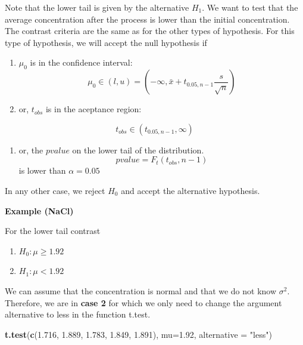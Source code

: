 \documentclass[
]{book}
\newenvironment{Shaded}{\begin{snugshade}}{\end{snugshade}}
\newcommand{\AttributeTok}[1]{\textcolor[rgb]{0.13,0.29,0.53}{#1}}
\newcommand{\FloatTok}[1]{\textcolor[rgb]{0.00,0.00,0.81}{#1}}
\newcommand{\FunctionTok}[1]{\textcolor[rgb]{0.13,0.29,0.53}{\textbf{#1}}}
\newcommand{\NormalTok}[1]{#1}
\newcommand{\StringTok}[1]{\textcolor[rgb]{0.31,0.60,0.02}{#1}}
\providecommand{\tightlist}{%
  \setlength{\itemsep}{0pt}\setlength{\parskip}{0pt}}
\begin{document}
Note that the lower tail is given by the alternative \(H_1\). We want to test that the average concentration after the process is lower than the initial concentration. The contrast criteria are the same as for the other types of hypothesis. For this type of hypothesis, we will accept the null hypothesis if

\begin{enumerate}
\def\labelenumi{\arabic{enumi}.}
\item
  \(\mu_0\) is in the confidence interval:
  \[\mu_0\in (l,u)=(-\infty, \bar{x}+t_{0.05,n-1} \frac{s}{\sqrt{n}})\]
\item
  or, \(t_{obs}\) is in the aceptance region:
\end{enumerate}

\[t_{obs}\in (t_{0.05,n-1}, \infty)\]

\begin{enumerate}
\def\labelenumi{\arabic{enumi}.}
\setcounter{enumi}{2}
\tightlist
\item
  or, the \(pvalue\) on the lower tail of the distribution.\\
  \[pvalue=F_t(t_{obs},n-1)\]
  is lower than \(\alpha=0.05\)
\end{enumerate}

In any other case, we reject \(H_0\) and accept the alternative hypothesis.

\textbf{Example (NaCl)}

For the lower tail contrast

\begin{enumerate}
\def\labelenumi{\alph{enumi}.}
\tightlist
\item
  \(H_0:\mu \geq 1.92\)
\item
  \(H_1:\mu < 1.92\)
\end{enumerate}

We can assume that the concentration is normal and that we do not know \(\sigma^2\). Therefore, we are in \textbf{case 2} for which we only need to change the argument alternative to less in the function t.test.

\begin{Shaded}
\begin{Highlighting}[]
\FunctionTok{t.test}\NormalTok{(}\FunctionTok{c}\NormalTok{(}\FloatTok{1.716}\NormalTok{, }\FloatTok{1.889}\NormalTok{, }\FloatTok{1.783}\NormalTok{, }\FloatTok{1.849}\NormalTok{, }\FloatTok{1.891}\NormalTok{), }
       \AttributeTok{mu=}\FloatTok{1.92}\NormalTok{, }\AttributeTok{alternative =} \StringTok{"less"}\NormalTok{)}
\end{Highlighting}
\end{Shaded}
\end{document}
